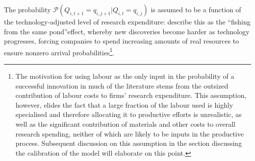 \documentclass{_latex/house}
\begin{document}
The probability $\mathcal{P}(Q_{i,t+1}=q_{i,j+1}|Q_{i,t}=q_{i,j})$ is assumed to be a function of the technology-adjusted level of research expenditure: \cite{RePEc:nbr:nberwo:16411} describe this as the \textquotedblleft fishing from the same pond\textquotedblright\:effect, whereby new discoveries become harder as technology progresses, forcing companies to spend increasing amounts of real resources to ensure nonzero arrival probabilities\footnote{The motivation for using labour as the only input in the probability of a successful innovation in much of the literature stems from the outsized contribution of labour costs to firms' research expenditure. This assumption, however, elides the fact that a large fraction of the labour used is highly specialised and therefore allocating it to productive efforts is unrealistic, as well as the significant contribution of materials and other costs to overall research spending, neither of which are likely to be inputs in the productive process. Subsequent discussion on this assumption in the section discussing the calibration of the model will elaborate on this point.}.
\end{document}

